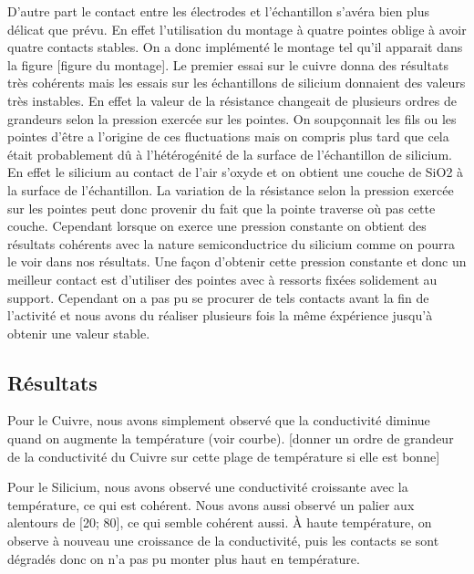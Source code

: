 D'autre part le contact entre les électrodes et l'échantillon s'avéra bien plus délicat que prévu. 
En effet l'utilisation du montage à quatre pointes oblige à avoir quatre contacts stables. On a donc implémenté 
le montage tel qu'il apparait dans la figure [figure du montage]. Le premier essai sur le cuivre donna des résultats 
très cohérents mais les essais sur les échantillons de silicium donnaient des valeurs très instables. 
En effet la valeur de la résistance changeait de plusieurs ordres de grandeurs selon la pression exercée sur les 
pointes. On soupçonnait les fils ou les pointes d'être a l'origine de ces fluctuations 
mais on compris plus tard que cela était probablement dû à l'hétérogénité de la surface de l'échantillon de silicium. 
En effet le silicium au contact de l'air s'oxyde et on obtient une couche de SiO2 à la surface de l'échantillon. 
La variation de la résistance selon la pression exercée sur les pointes peut donc provenir du fait que la pointe 
traverse où pas cette couche. Cependant lorsque on exerce une pression constante on obtient des résultats cohérents avec la nature semiconductrice du silicium comme on pourra le voir dans nos résultats. Une façon d'obtenir cette pression constante et donc un meilleur contact est d'utiliser des pointes avec à ressorts fixées solidement au support. Cependant on a pas pu se procurer de tels contacts avant la fin de l'activité et nous avons du réaliser plusieurs fois la même éxpérience jusqu'à obtenir une valeur stable.


\subsection{Résultats}
Pour le Cuivre, nous avons simplement observé que la conductivité diminue quand on augmente la température (voir courbe).
[donner un ordre de grandeur de la conductivité du Cuivre sur cette plage de température si elle est bonne]


Pour le Silicium, nous avons observé une conductivité croissante avec la température, ce qui est cohérent. Nous avons aussi observé un palier aux alentours de [20\celsius{}; 80\celsius{}], ce qui semble cohérent aussi.
À haute température, on observe à nouveau une croissance de la conductivité, 
puis les contacts se sont dégradés donc on n'a pas pu monter plus haut en température.


